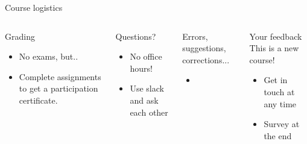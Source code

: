 \begin{frame}{Course logistics}
    
    \begin{columns}
   
        \begin{block}{Grading}
            \begin{itemize}
                \item No exams, but..
                \item Complete assignments to get a participation certificate.
            \end{itemize}
        \end{block}

        \begin{block}{Questions?}
            \begin{itemize}
                \item No office hours!
                \item Use slack and ask each other
            \end{itemize}
        \end{block}

    
        \begin{block}{Errors, suggestions, corrections...}
            \begin{itemize}
                \item  {}
            \end{itemize}
        \end{block}

        \begin{block}{Your feedback}
        This is a new course!
            \begin{itemize}
                \item Get in touch at any time
                \item Survey at the end
            \end{itemize}
        \end{block}

        \end{columns}
    
\end{frame}
